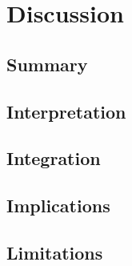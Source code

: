 \chapter{Discussion}


\section{Summary}
\label{summary}


\section{Interpretation}
\label{interpretation}


\section{Integration}
\label{integration}


\section{Implications}
\label{implications}


\section{Limitations}
\label{limitations}

